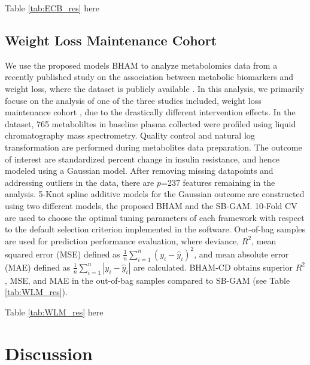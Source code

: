 \documentclass[AMA,STIX1COL,]{WileyNJD-v2}
\begin{document}
\begin{center}
Table \ref{tab:ECB_res} here
\end{center}

\hypertarget{weight-loss-maintenance-cohort}{%
\subsection{Weight Loss Maintenance
Cohort}\label{weight-loss-maintenance-cohort}}

We use the proposed models BHAM to analyze metabolomics data from a
recently published study \citep{Bihlmeyer2021} on the association
between metabolic biomarkers and weight loss, where the dataset is
publicly available \citep{Bihlmeyer2021_data}. In this analysis, we
primarily focuse on the analysis of one of the three studies included,
weight loss maintenance cohort \citep{Svetkey2008}, due to the
drastically different intervention effects. In the dataset, 765
metaboliltes in baseline plasma collected were profiled using liquid
chromatography mass spectrometry. Quality control and natural log
transformation are performed during metabolites data preparation. The
outcome of interest are standardized percent change in insulin
resistance, and hence modeled using a Gaussian model. After removing
missing datapoints and addressing outliers in the data, there are
\(p\)=237 features remaining in the analysis. 5-Knot spline additive
models for the Gaussian outcome are constructed using two different
models, the proposed BHAM and the SB-GAM. 10-Fold CV are used to choose
the optimal tuning parameters of each framework with respect to the
default selection criterion implemented in the software. Out-of-bag
samples are used for prediction performance evaluation, where deviance,
\(R^2\), mean squared error (MSE) defined as
\(\frac{1}{n}\sum\limits^{n}_{i=1}(y_i - \hat y_i)^2\), and mean
absolute error (MAE) defined as
\(\frac{1}{n}\sum\limits^{n}_{i=1}|y_i - \hat y_i|\) are calculated.
BHAM-CD obtains superior \(R^2\), MSE, and MAE in the out-of-bag samples
compared to SB-GAM (see Table \ref{tab:WLM_res}).

\begin{center}
Table \ref{tab:WLM_res} here
\end{center}

\hypertarget{discussion}{%
\section{Discussion}\label{discussion}}
\end{document}
